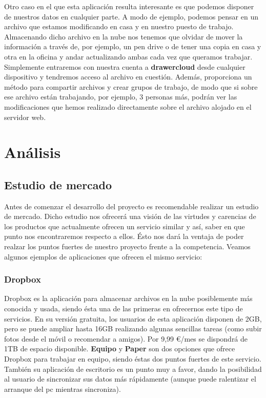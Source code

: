 Otro caso en el que esta aplicación resulta interesante es que podemos disponer de nuestros datos en cualquier parte. A modo de ejemplo, podemos pensar en un archivo que estamos modificando en casa y en nuestro puesto de trabajo. Almacenando dicho archivo en la nube nos tenemos que olvidar de mover la información a través de, por ejemplo, un pen drive o de tener una copia en casa y otra en la oficina y andar actualizando ambas cada vez que queramos trabajar. Simplemente entraremos con nuestra cuenta a \textbf{drawercloud} desde cualquier dispositivo y tendremos acceso al archivo en cuestión. Además, proporciona un método para compartir archivos y crear grupos de trabajo, de modo que si sobre ese archivo están trabajando, por ejemplo, 3 personas más, podrán ver las modificaciones que hemos realizado directamente sobre el archivo alojado en el servidor web.

\newpage
\section{Análisis}
\subsection{Estudio de mercado}
Antes de comenzar el desarrollo del proyecto es recomendable realizar un estudio de mercado. Dicho estudio nos ofrecerá una visión de las virtudes y carencias de los productos que actualmente ofrecen un servicio similar y así, saber en que punto nos encontraremos respecto a ellos. Ésto nos dará la ventaja de poder realzar los puntos fuertes de nuestro proyecto frente a la competencia. Veamos algunos ejemplos de aplicaciones que ofrecen el mismo servicio: \\

\hfill\begin{minipage}{\dimexpr\textwidth-1cm}
\subsubsection{Dropbox \cite{cita_dropbox}}
Dropbox es la aplicación para almacenar archivos en la nube posiblemente más conocida y usada, siendo ésta una de las primeras en ofrecernos este tipo de servicios. En su versión gratuita, los usuarios de esta aplicación disponen de 2GB, pero se puede ampliar hasta 16GB realizando algunas sencillas tareas (como subir fotos desde el móvil o recomendar a amigos). Por 9,99 \euro/mes se dispondrá de 1TB de espacio disponible. \textbf{Equipo} y \textbf{Paper} son dos opciones que ofrece Dropbox para trabajar en equipo, siendo éstas dos puntos fuertes de este servicio. También su aplicación de escritorio es un punto muy a favor, dando la posibilidad al usuario de sincronizar sus datos más rápidamente (aunque puede ralentizar el arranque del pc mientras sincroniza). \\
\end{minipage}

